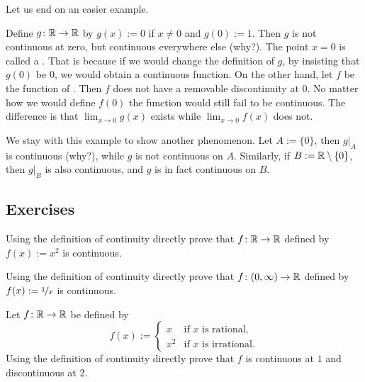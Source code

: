 Let us end on an easier example.

\begin{example}
Define
$g \colon {\mathbb{R}} \to {\mathbb{R}}$ by $g(x) := 0$ if $x \not= 0$ and
$g(0) := 1$.  Then $g$ is not continuous at zero, but continuous everywhere else (why?).
The point $x=0$ is called a \emph{}.  That
is because if we would change the definition of $g$, by insisting that
$g(0)$ be $0$, we would obtain a continuous function.  On the other hand,
let $f$ be the function of .
Then $f$ does not have a
removable discontinuity at $0$.  No matter how we would define $f(0)$ the function
would still fail to be continuous.  The difference is that 
$\lim_{x\to 0} g(x)$ exists while
$\lim_{x\to 0} f(x)$ does not.

We stay with this example to show another phenomenon.  Let $A := \{ 0
\}$, then $g|_A$ is continuous (why?), while $g$ is not continuous on $A$.
Similarly, if $B := {\mathbb{R}} \setminus \{0 \}$, then $g|_B$ is also continuous,
and $g$ is in fact continuous on $B$.
\end{example}

\subsection{Exercises}

\begin{exercise}
Using the definition of continuity directly prove that
$f \colon {\mathbb{R}} \to {\mathbb{R}}$ defined by
$f(x) := x^2$ is continuous.
\end{exercise}

\begin{exercise}
Using the definition of continuity directly prove that
$f \colon (0,\infty) \to {\mathbb{R}}$ defined by
$f(x) := \nicefrac{1}{x}$ is continuous.
\end{exercise}

\begin{exercise}
Let $f \colon {\mathbb{R}} \to {\mathbb{R}}$ be defined by
\begin{equation*}
f(x) :=
\begin{cases}
x & \text{if } x \text{ is rational,} \\
x^2 & \text{if } x \text{ is irrational.}
\end{cases}
\end{equation*}
Using the definition of continuity directly prove that
$f$ is continuous at $1$ and discontinuous at $2$.
\end{exercise}

